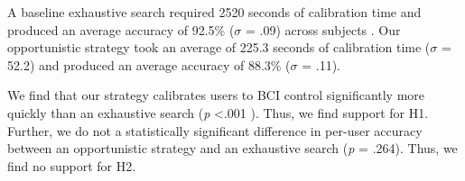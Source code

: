 A baseline exhaustive search required 2520 seconds of calibration time and produced an average accuracy of 92.5\% (\textit{$\sigma$} = .09) across subjects . Our opportunistic strategy took an average of 225.3 seconds of calibration time (\textit{$\sigma$} = 52.2) and produced an average accuracy of 88.3\% (\textit{$\sigma$} = .11).

We find that our strategy calibrates users to BCI control significantly more quickly than an exhaustive search (\textit{p} \textless .001 ). Thus, we find support for H1. Further, we do not a statistically significant difference in per-user accuracy between an opportunistic strategy and an exhaustive search (\textit{p} = .264). Thus, we find no support for H2.

